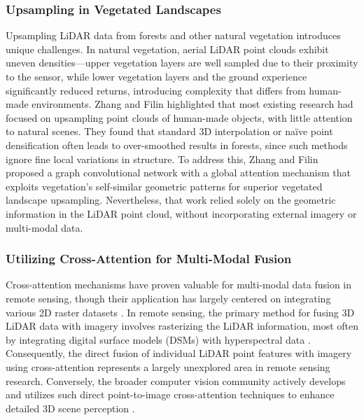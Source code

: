 \documentclass[remotesensing,article,accept,pdftex,moreauthors]{Definitions/mdpi}
\begin{document}
\subsubsection{Upsampling in Vegetated Landscapes}

Upsampling LiDAR data from forests and other natural vegetation introduces unique challenges. In natural vegetation, aerial LiDAR point clouds exhibit uneven densities—upper vegetation layers are well sampled due to their proximity to the sensor, while lower vegetation layers and the ground experience significantly reduced returns, introducing complexity that differs from human-made environments. Zhang and Filin \cite{zhang2022deep} highlighted that most existing research had focused on upsampling point clouds of human-made objects, with little attention to natural scenes. They found that standard 3D interpolation or naïve point densification often leads to over-smoothed results in forests, since such methods ignore fine local variations in structure. To address this, Zhang and Filin proposed a graph convolutional network with a global attention mechanism that exploits vegetation's self-similar geometric patterns for superior vegetated landscape upsampling. Nevertheless, that work relied solely on the geometric information in the LiDAR point cloud, without incorporating external imagery or multi-modal data.

\subsubsection{Utilizing Cross-Attention for Multi-Modal Fusion}

Cross-attention mechanisms have proven valuable for multi-modal data fusion in remote sensing, though their application has largely centered on integrating various 2D raster datasets \cite{yan2025remote, ma2022crossmodal, qingyun2022cross, li2024cross}. In remote sensing, the primary method for fusing 3D LiDAR data with imagery involves rasterizing the LiDAR information, most often by integrating digital surface models (DSMs) with hyperspectral data \cite{yu2024dmsca, li2024multi, yang2024lidar}. Consequently, the direct fusion of individual LiDAR point features with imagery using cross-attention represents a largely unexplored area in remote sensing research. Conversely, the broader computer vision community actively develops and utilizes such direct point-to-image cross-attention techniques to enhance detailed 3D scene perception \cite{zhu2024cams, yoo20203d, wu2021point}.
\end{document}
